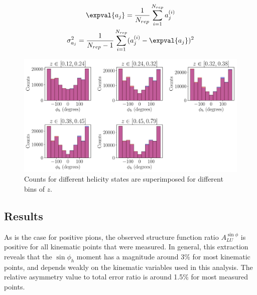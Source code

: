 \begin{gather}
  \expval{a_j} = \frac{1}{N_{rep}} \sum_{i=1}^{N_{rep}} a_{j}^{(i)} \\
  \sigma_{a_j}^{2} = \frac{1}{N_{rep}-1} \sum_{i=1}^{N_{rep}} (a_{j}^{(i)} - \expval{a_j})^2 
\end{gather}

\begin{figure}
	\centering
	\includegraphics[width=16cm]{image/plots/kaon-bsa/z-phi-counts.pdf}
	\caption{Counts for different helicity states are superimposed for different bins of $z$.}
\end{figure}

\subsection{Results}
%
%
As is the case for positive pions, the observed structure function ratio $A_{LU}^{\sin\phi}$ is positive for all kinematic points that were measured.  In general, this extraction reveals that the $\sin\phi_h$ moment has a magnitude around 3\% for most kinematic points, and depends weakly on the kinematic variables used in this analysis.  The relative asymmetry value to total error ratio is around 1.5\% for most measured points.


